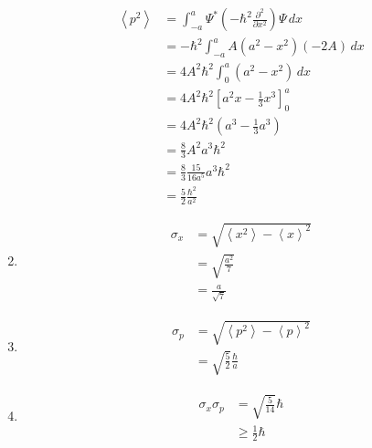 \documentclass{article}
\newcommand{\ev}[1]{\left< #1 \right>}
\begin{document}
\begin{enumerate}
        \begin{align*}
          \ev{p^2} & = \int_{-a}^a \Psi^* \left( -\hbar^2 \frac{\partial^2}{\partial x^2} \right) \Psi \,d x \\
                   & = -\hbar^2 \int_{-a}^a A (a^2 - x^2) (-2 A) \,d x                                       \\
                   & = 4 A^2 \hbar^2 \int_0^a (a^2 - x^2) \,d x                                              \\
                   & = 4 A^2 \hbar^2 \left[ a^2 x - \frac{1}{3} x^3 \right]_0^a                              \\
                   & = 4 A^2 \hbar^2 \left( a^3 - \frac{1}{3} a^3 \right)                                    \\
                   & = \frac{8}{3} A^2 a^3 \hbar^2                                                           \\
                   & = \frac{8}{3} \frac{15}{16 a^5} a^3 \hbar^2                                             \\
                   & = \frac{5}{2} \frac{\hbar^2}{a^2}
        \end{align*}

  \item

        \begin{align*}
          \sigma_x & = \sqrt{\ev{x^2} - \ev{x}^2} \\
                   & = \sqrt{\frac{a^2}{7}}       \\
                   & = \frac{a}{\sqrt{7}}
        \end{align*}

  \item

        \begin{align*}
          \sigma_p & = \sqrt{\ev{p^2} - \ev{p}^2}         \\
                   & = \sqrt{\frac{5}{2}} \frac{\hbar}{a}
        \end{align*}

  \item

        \begin{align*}
          \sigma_x \sigma_p & = \sqrt{\frac{5}{14}} \hbar \\
                            & \ge \frac{1}{2} \hbar
        \end{align*}
\end{enumerate}
\end{document}
